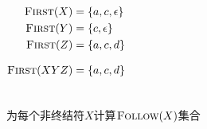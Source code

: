


\begin{frame}{}
  \begin{columns}
      
      \pause
      \begin{align*}
        \textsc{First}(X) &= \{a, c, \epsilon\} \\
        \textsc{First}(Y) &= \{c, \epsilon\} \\
        \textsc{First}(Z) &= \{a, c, d\} \\[8pt]
        \textsc{First}(XYZ) &= \{a, c, d\}
      \end{align*}
  \end{columns}
\end{frame}

\begin{frame}{}
  \begin{center}
    {\large 为每个非终结符$X$计算$\textsc{Follow}(X)$集合}

    

    \pause
  \end{center}
\end{frame}




